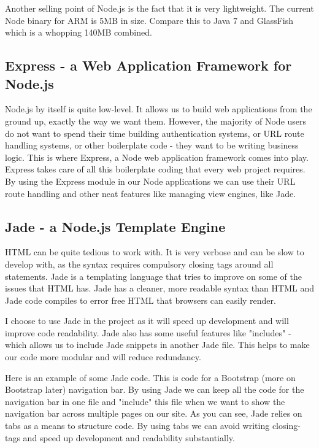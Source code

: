 Another selling point of Node.js is the fact that it is very lightweight. The current Node binary for ARM is 5MB in size. Compare this to Java 7 and GlassFish which is a whopping 140MB combined.


\subsection{Express - a Web Application Framework for Node.js}
Node.js by itself is quite low-level. It allows us to build web applications from the ground up, exactly the way we want them. However, the majority of Node users do not want to spend their time building authentication systems, or URL route handling systems, or other boilerplate code - they want to be writing business logic. This is where Express\cite{express}, a Node web application framework comes into play. Express takes care of all this boilerplate coding that every web project requires. By using the Express module in our Node applications we can use their URL route handling and other neat features like managing view engines, like Jade\cite{jade}.


\subsection{Jade - a Node.js Template Engine}
HTML can be quite tedious to work with. It is very verbose and can be slow to develop with, as the syntax requires compulsory closing tags around all statements. Jade is a templating language that tries to improve on some of the issues that HTML has. Jade has a cleaner, more readable syntax than HTML and Jade code compiles to error free HTML that browsers can easily render.

I choose to use Jade in the project as it will speed up development and will improve code readability. Jade also has some useful features like "includes" - which allows us to include Jade snippets in another Jade file. This helps to make our code more modular and will reduce redundancy.

Here is an example of some Jade code. This is code for a Bootstrap (more on Bootstrap later) navigation bar. By using Jade we can keep all the code for the navigation bar in one file and "include" this file when we want to show the navigation bar across multiple pages on our site. As you can see, Jade relies on tabs as a means to structure code. By using tabs we can avoid writing closing-tags and speed up development and readability substantially. 


